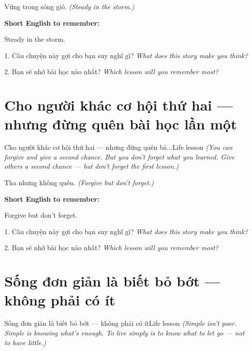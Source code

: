 \begin{baihoc}
Vững trong sóng gió.
\textit{(Steady in the storm.)}
\end{baihoc}

\begin{ghinhoanh}
\textbf{Short English to remember:}

Steady in the storm.

\end{ghinhoanh}

\begin{tuhocnhanh}
1. Câu chuyện này gợi cho bạn suy nghĩ gì? \textit{What does this story make you think?}

2. Bạn sẽ nhớ bài học nào nhất? \textit{Which lesson will you remember most?}
\end{tuhocnhanh}
\ngancach


\section{Cho người khác cơ hội thứ hai — nhưng đừng quên bài học lần một}
\begin{truyen}{Cho người khác cơ hội thứ hai — nhưng đừng quên bà...}{Life lesson}
\textit{(You can forgive and give a second chance. But you don't forget what you learned. Give others a second chance — but don't forget the first lesson.)}
\end{truyen}

\begin{baihoc}
Tha nhưng không quên.
\textit{(Forgive but don't forget.)}
\end{baihoc}

\begin{ghinhoanh}
\textbf{Short English to remember:}

Forgive but don't forget.

\end{ghinhoanh}

\begin{tuhocnhanh}
1. Câu chuyện này gợi cho bạn suy nghĩ gì? \textit{What does this story make you think?}

2. Bạn sẽ nhớ bài học nào nhất? \textit{Which lesson will you remember most?}
\end{tuhocnhanh}
\ngancach


\section{Sống đơn giản là biết bỏ bớt — không phải có ít}
\begin{truyen}{Sống đơn giản là biết bỏ bớt — không phải có ít}{Life lesson}
\textit{(Simple isn't poor. Simple is knowing what's enough. To live simply is to know what to let go — not to have little.)}
\end{truyen}

